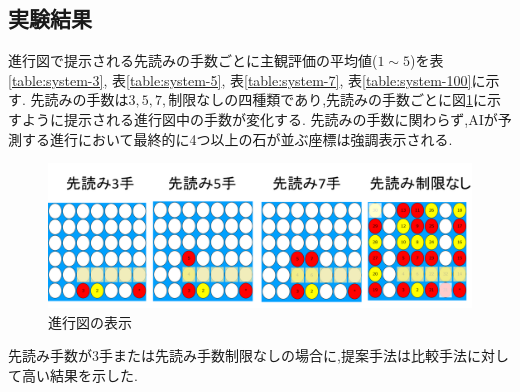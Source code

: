 \subsection{実験結果}
進行図で提示される先読みの手数ごとに主観評価の平均値($1\sim5$)を表\ref{table:system-3}, 表\ref{table:system-5}, 表\ref{table:system-7}, 表\ref{table:system-100}に示す.
先読みの手数は${3, 5, 7, \textrm{制限なし}}$の四種類であり,先読みの手数ごとに図\ref{fig:see}に示すように提示される進行図中の手数が変化する.
先読みの手数に関わらず,AIが予測する進行において最終的に4つ以上の石が並ぶ座標は強調表示される.
\begin{figure}[t]
    \centering
    \includegraphics[width=\linewidth]{./figure/see.png}
	\caption{進行図の表示}
	\label{fig:see}
\end{figure}
先読み手数が3手または先読み手数制限なしの場合に,提案手法は比較手法に対して高い結果を示した.
\begin{table}[H]
    \caption{先読み手数３手の場合}
    \label{table:system-3}
    \scriptsize
    \centering
    
\end{table}
